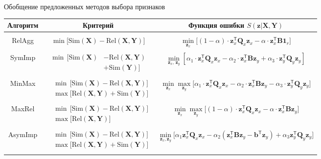 \documentclass[9pt]{beamer}
\newcommand{\bz}{\mathbf{z}}
\newcommand{\bb}{\mathbf{b}}
\newcommand{\bY}{\mathbf{Y}}
\newcommand{\bX}{\mathbf{X}}
\newcommand{\bB}{\mathbf{B}}
\newcommand{\bQ}{\mathbf{Q}}
\newcommand{\bOne}{\boldsymbol{1}}
\newcommand{\T}{\mathsf{T}}
\begin{document}
\begin{frame}{Обобщение предложенных методов выбора признаков}
\begin{table}
	\centering
	\footnotesize{
		\begin{tabular}{c|c|c}
			\hline
			Алгоритм & Критерий & Функция ошибки $S(\bz | \bX, \bY)$ \\
			\hline && \\ 
			RelAgg & $\min \bigl[ \text{Sim}(\bX) - \text{Rel}(\bX, \bY) \bigr] $ & $\min\limits_{\bz_x} \bigl[ (1 - \alpha) \cdot \bz_x^{\T} \bQ_x \bz_x - \alpha \cdot \bz_x^{\T} \bB \bOne_r \bigr] $ \\ &&\\
			SymImp & $\begin{aligned} \min \, \bigl[ \text{Sim}(\bX) & - \text{Rel}(\bX, \bY) \\ & + \text{Sim}(\bY) \bigr] \end{aligned}$ & $ \min\limits_{\bz_x, \, \bz_y} \left[ \alpha_1 \cdot \bz_x^{\T} \bQ_x \bz_x - \alpha_2 \cdot \bz_x^{\T} \bB \bz_y + \alpha_3 \cdot \bz_y^{\T} \bQ_y \bz_y \right] $\\ &&\\ 
			MinMax & $\begin{aligned} &\min \, \bigl[ \text{Sim}(\bX) - \text{Rel}(\bX, \bY) \bigr]  \\ & \max \bigl[\text{Rel}(\bX, \bY) + \text{Sim}(\bY) \bigr] \end{aligned}$ & $	\min\limits_{\bz_x} 	\max\limits_{\bz_y} \bigl[\alpha_1 \cdot \bz_x^{\T} \bQ_x \bz_x - \alpha_2 \cdot \bz_x^{\T} \bB \bz_y - \alpha_3 \cdot \bz_y^{\T} \bQ_y \bz_y \bigr]$ \\ &&\\ 
			MaxRel & $\begin{aligned} &\min \, \bigl[ \text{Sim}(\bX) - \text{Rel}(\bX, \bY) \bigr]  \\ & \max \bigl[\text{Rel}(\bX, \bY) \bigr] \end{aligned}$& $\min\limits_{\bz_x} 	\max\limits_{\bz_y} \bigl[ (1 - \alpha) \cdot \bz_x^{\T} \bQ_x \bz_x - \alpha \cdot \bz_x^{\T} \bB \bz_y \bigr]$ \\ 		&&\\
			AsymImp & $\begin{aligned} & \min \, \bigl[ \text{Sim}(\bX) - \text{Rel}(\bX, \bY) \bigr]\\ &  \max \bigl[\text{Rel}(\bX, \bY) + \text{Sim}(\bY) \bigr] \end{aligned}$ & $\min\limits_{\bz_x, \bz_y} \bigl[ \alpha_1 \bz_x^{\T} \bQ_x \bz_x - \alpha_2 \left(\bz_x^{\T} \bB \bz_y - \bb^{\T} \bz_y \right) + \alpha_3  \bz_y^{\T} \bQ_y \bz_y \bigr]$\\  && \\
			\hline
	\end{tabular}}
\end{table}
\end{frame}
\end{document}
